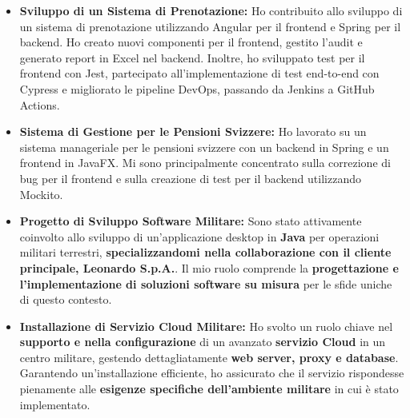 \documentclass[10pt,a4paper]{altacv}
\begin{document}



 \begin{itemize} \item \textbf{Sviluppo di un Sistema di Prenotazione:} Ho contribuito allo sviluppo di un sistema di prenotazione utilizzando Angular per il frontend e Spring per il backend. Ho creato nuovi componenti per il frontend, gestito l'audit e generato report in Excel nel backend. Inoltre, ho sviluppato test per il frontend con Jest, partecipato all'implementazione di test end-to-end con Cypress e migliorato le pipeline DevOps, passando da Jenkins a GitHub Actions.

\item \textbf{Sistema di Gestione per le Pensioni Svizzere:} Ho lavorato su un sistema manageriale per le pensioni svizzere con un backend in Spring e un frontend in JavaFX. Mi sono principalmente concentrato sulla correzione di bug per il frontend e sulla creazione di test per il backend utilizzando Mockito. \end{itemize}

\vspace{1em}

\begin{itemize}
  \item \textbf{Progetto di Sviluppo Software Militare:} Sono stato attivamente coinvolto allo sviluppo di un'applicazione desktop in \textbf{Java} per operazioni militari terrestri, \textbf{specializzandomi nella collaborazione con il cliente principale, Leonardo S.p.A.}. Il mio ruolo comprende la \textbf{progettazione e l'implementazione di soluzioni software su misura} per le sfide uniche di questo contesto.

  \item \textbf{Installazione di Servizio Cloud Militare:} Ho svolto un ruolo chiave nel \textbf{supporto e nella configurazione} di un avanzato \textbf{servizio Cloud} in un centro militare, gestendo dettagliatamente \textbf{web server, proxy e database}. Garantendo un'installazione efficiente, ho assicurato che il servizio rispondesse pienamente alle \textbf{esigenze specifiche dell'ambiente militare} in cui è stato implementato.
\end{itemize}
\end{document}
